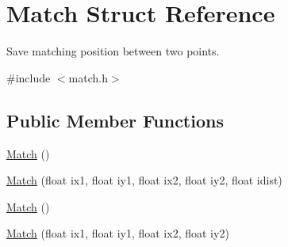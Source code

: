 \hypertarget{structMatch}{}\section{Match Struct Reference}
\label{structMatch}


Save matching position between two points.  




{\ttfamily \#include $<$match.\+h$>$}

\subsection*{Public Member Functions}
\begin{DoxyCompactItemize}
\item 
\hyperlink{structMatch_a990b0300aeee204fd90d6d846b9aea0e}{Match} ()
\item 
\hyperlink{structMatch_a7866281a0d6dc60a6072eb7a8286a8b4}{Match} (float ix1, float iy1, float ix2, float iy2, float idist)
\item 
\hyperlink{structMatch_a990b0300aeee204fd90d6d846b9aea0e}{Match} ()
\item 
\hyperlink{structMatch_a6d4ac71c5dc862952a3c88d5e9d2908a}{Match} (float ix1, float iy1, float ix2, float iy2)
\end{DoxyCompactItemize}
